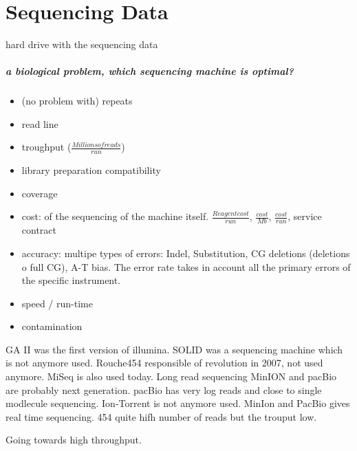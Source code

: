 \chapter{Sequencing Data}
hard drive with the sequencing data

\paragraph{a biological problem, which sequencing machine is optimal?}
\begin{itemize}
\item (no problem with) repeats
\item read line
\item troughput ($\frac{Millions of reads}{run}$)
\item library preparation compatibility
\item coverage
\item cost: of the sequencing of the machine itself. $\frac{ Reagent cost}{run}$, $\frac{cost}{Mb}$, $\frac{cost}{run}$, service contract
\item accuracy: multipe types of errors: Indel, Substitution, CG deletions (deletions o full CG), A-T bias. The error rate takes in account all the primary errors of the specific instrument.
\item speed / run-time
\item contamination
\end{itemize}




GA II was the first version of illumina. SOLID was a sequencing machine which is not anymore used. Rouche454 responsible of revolution in 2007, not used anymore. MiSeq is also used today. Long read sequencing MinION and pacBio are probably next generation.
pacBio has very log reads and close to single modlecule sequencing.
Ion-Torrent is not anymore used.
MinIon and PacBio gives real time sequencing. 454 quite hifh number of reads but the trouput low.




Going towards high throughput.


